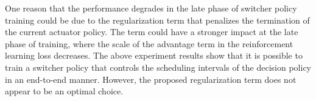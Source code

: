 One reason that the performance degrades in the late phase of switcher policy training could be due to the regularization term that penalizes the termination of the current actuator policy. The term could have a stronger impact at the late phase of training, where the scale of the advantage term in the reinforcement learning loss decreases.
The above experiment results show that it is possible to train a switcher policy that controls the scheduling intervals of the decision policy in an end-to-end manner. However, the proposed regularization term does not appear to be an optimal choice. 